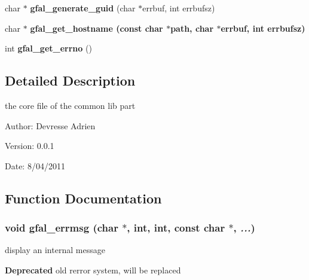 \begin{CompactItemize}
\item 
char $\ast$ \textbf{gfal\_\-generate\_\-guid} (char $\ast$errbuf, int errbufsz)\label{group__internal__group_g8311ede197e204e57029165fbc3898d6}

\item 
char $\ast$ \bf{gfal\_\-get\_\-hostname} (const char $\ast$path, char $\ast$errbuf, int errbufsz)
\item 
int \textbf{gfal\_\-get\_\-errno} ()\label{gfal__common_8c_4f4c3163c72535da9dd42484905b1c7c}

\end{CompactItemize}


\subsection{Detailed Description}
the core file of the common lib part 

\begin{Desc}
\item[Author:]Devresse Adrien \end{Desc}
\begin{Desc}
\item[Version:]0.0.1 \end{Desc}
\begin{Desc}
\item[Date:]8/04/2011 \end{Desc}


\subsection{Function Documentation}
\subsubsection{\setlength{\rightskip}{0pt plus 5cm}void gfal\_\-errmsg (char $\ast$, int, int, const char $\ast$,  {\em ...})}\label{gfal__common_8c_e6fb0cae56e9344c2b6ed23001f7dcb5}


display an internal message 

\begin{Desc}
\item[\bf{Deprecated}]old rerror system, will be replaced \end{Desc}
